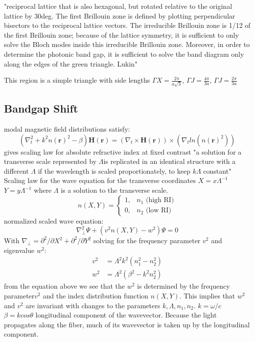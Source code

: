 "reciprocal lattice that is also hexagonal, but rotated relative to the original lattice by 30deg. The first Brillouin zone is defined by plotting perpendicular bisectors to the reciprocal lattice vectors. The irreducible Brillouin zone is 1/12 of the first Brillouin zone; because of the lattice symmetry, it is sufficient to only solve the Bloch modes inside this irreducible Brillouin zone. Moreover, in order to determine the photonic band gap, it is sufficient to solve the band diagram only along the edges of the green triangle. Lukin"

This region is a simple triangle with side lengths $\Gamma X = \frac{2\pi}{a\sqrt{3}}$, $\Gamma J = \frac{4\pi}{3a}$, $\Gamma J = \frac{2\pi}{3a}$ 


\subsection{Bandgap Shift}
modal magnetic field distributions satisfy:
\begin{equation}
	(\nabla^2_t + k^2n(\boldsymbol{r})^2 - \beta)\boldsymbol{H(r)} = (\nabla_t\times\boldsymbol{H(r)})\times(\nabla_t ln(n(\boldsymbol{r})^2))
\end{equation}
gives scaling law for absolute refractive index at fixed contrast
"a solution for a transverse scale represented by $\Lambda$is replicated in an identical structure with a different $\Lambda$ if the wavelength is scaled proportionately, to keep $k\Lambda$ constant"
Scaling law for the wave equation for the transverse coordinates
$X=x\Lambda^{-1}$ $Y=y\Lambda^{-1}$
where $\Lambda$ is a solution to the transverse scale. 
\begin{equation}
	n(X, Y) = \begin{cases}
		1, &n_1 \text{   (high RI)}\\
		0, & n_2 \text{   (low RI)}
	\end{cases}
\end{equation}
normalized scaled wave equation:
\begin{equation}
	\nabla_\perp^2\Psi + (v^2n(X, Y) - w^2)\Psi = 0
\end{equation}
With $\nabla_\perp = \partial^2/\partial X^2 + \partial^2/\partial Y^2 $
solving for the frequency parameter $v^2$ and eigenvalue $w^2$:
\begin{equation}
	\begin{aligned}
		v^2  &= \Lambda^2k^2(n_1^2 - n_2^2)\\
		w^2 &= \Lambda^2(\beta^2 - k^2n_2^2)
	\end{aligned}
\end{equation}
from the equation above we see that the $w^2$ is determined by the frequency parameter$v^2$ and the index distribution function $n(X, Y)$. This implies that $w^2$ and $v^2$ are invariant with changes to the parameters $k, \Lambda, n_1, n_2$. 
$k = \omega/c$ $\beta = kcos\theta$ longitudinal component of the wavevector. Because the light propagates along the fiber, much of its wavevector is taken up by the longitudinal component. 

